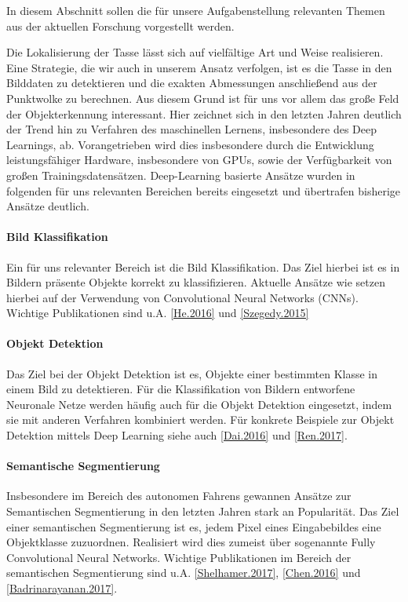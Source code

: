 In diesem Abschnitt sollen die für unsere Aufgabenstellung relevanten Themen aus der aktuellen Forschung vorgestellt werden.

Die Lokalisierung der Tasse lässt sich auf vielfältige Art und Weise realisieren. Eine Strategie, die wir auch in unserem Ansatz verfolgen, ist es die Tasse in den Bilddaten zu detektieren und die exakten Abmessungen anschließend aus der Punktwolke zu berechnen. Aus diesem Grund ist für uns vor allem das große Feld der Objekterkennung interessant. Hier zeichnet sich in den letzten Jahren deutlich der Trend hin zu Verfahren des maschinellen Lernens, insbesondere des Deep Learnings, ab. Vorangetrieben wird dies insbesondere durch die Entwicklung leistungsfähiger Hardware, insbesondere von GPUs, sowie der Verfügbarkeit von großen Trainingsdatensätzen. Deep-Learning basierte Ansätze wurden in folgenden für uns relevanten Bereichen bereits eingesetzt und übertrafen bisherige Ansätze deutlich.

\paragraph{Bild Klassifikation}
Ein für uns relevanter Bereich ist die Bild Klassifikation. Das Ziel hierbei ist es in Bildern präsente Objekte korrekt zu klassifizieren. Aktuelle Ansätze wie setzen hierbei auf der Verwendung von Convolutional Neural Networks (CNNs). Wichtige Publikationen sind u.A. \ref{He.2016} und \ref{Szegedy.2015}

\paragraph{Objekt Detektion}
Das Ziel bei der Objekt Detektion ist es, Objekte einer bestimmten Klasse in einem Bild zu detektieren. Für die Klassifikation von Bildern entworfene Neuronale Netze werden häufig auch für die Objekt Detektion eingesetzt, indem sie mit anderen Verfahren kombiniert werden. Für konkrete Beispiele zur Objekt Detektion mittels Deep Learning siehe auch \ref{Dai.2016} und \ref{Ren.2017}. 

\paragraph{Semantische Segmentierung}
Insbesondere im Bereich des autonomen Fahrens gewannen Ansätze zur Semantischen Segmentierung in den letzten Jahren stark an Popularität. Das Ziel einer semantischen Segmentierung ist es, jedem Pixel eines Eingabebildes eine Objektklasse zuzuordnen. Realisiert wird dies zumeist über sogenannte Fully Convolutional Neural Networks. Wichtige Publikationen im Bereich der semantischen Segmentierung sind u.A. \ref{Shelhamer.2017}, \ref{Chen.2016} und \ref{Badrinarayanan.2017}.

